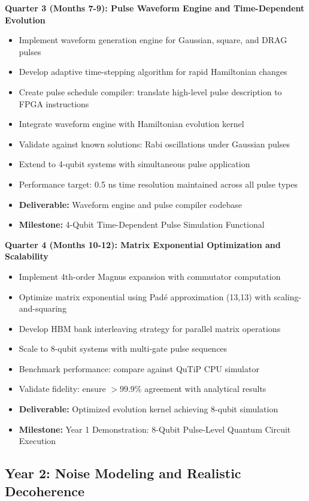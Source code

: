 \documentclass[12pt,a4paper]{article}
\begin{document}
\textbf{Quarter 3 (Months 7-9): Pulse Waveform Engine and Time-Dependent Evolution}

\begin{itemize}[noitemsep]
\item Implement waveform generation engine for Gaussian, square, and DRAG pulses
\item Develop adaptive time-stepping algorithm for rapid Hamiltonian changes
\item Create pulse schedule compiler: translate high-level pulse description to FPGA instructions
\item Integrate waveform engine with Hamiltonian evolution kernel
\item Validate against known solutions: Rabi oscillations under Gaussian pulses
\item Extend to 4-qubit systems with simultaneous pulse application
\item Performance target: 0.5 ns time resolution maintained across all pulse types
\item \textbf{Deliverable:} Waveform engine and pulse compiler codebase
\item \textbf{Milestone:} 4-Qubit Time-Dependent Pulse Simulation Functional
\end{itemize}

\textbf{Quarter 4 (Months 10-12): Matrix Exponential Optimization and Scalability}

\begin{itemize}[noitemsep]
\item Implement 4th-order Magnus expansion with commutator computation
\item Optimize matrix exponential using Padé approximation (13,13) with scaling-and-squaring
\item Develop HBM bank interleaving strategy for parallel matrix operations
\item Scale to 8-qubit systems with multi-gate pulse sequences
\item Benchmark performance: compare against QuTiP CPU simulator
\item Validate fidelity: ensure $>99.9\%$ agreement with analytical results
\item \textbf{Deliverable:} Optimized evolution kernel achieving 8-qubit simulation
\item \textbf{Milestone:} Year 1 Demonstration: 8-Qubit Pulse-Level Quantum Circuit Execution
\end{itemize}

\subsection{Year 2: Noise Modeling and Realistic Decoherence}
\end{document}
